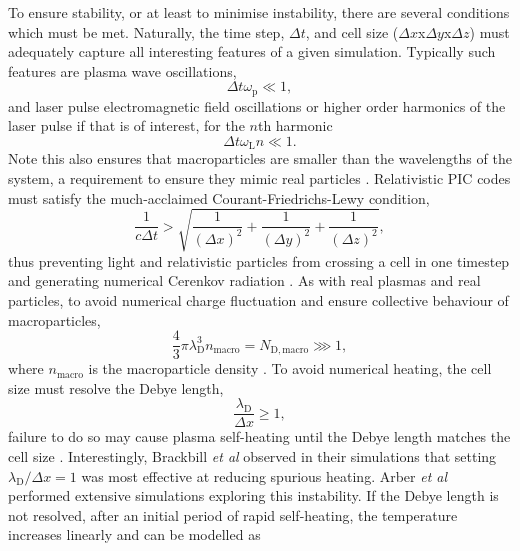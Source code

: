 To ensure stability, or at least to minimise instability, there are several conditions which must be met. Naturally, the time step, $\Delta t$, and cell size ($\Delta x$x$\Delta y$x$\Delta z$) must adequately capture all interesting features of a given simulation. Typically such features are plasma wave oscillations,
\begin{equation}
	\Delta t \omega_\mathrm{p} \ll 1,
\end{equation} 
and laser pulse electromagnetic field oscillations or higher order harmonics of the laser pulse if that is of interest, for the $n$th harmonic
\begin{equation}
	\Delta t\omega_\mathrm{L}n \ll 1.
\end{equation} 
Note this also ensures that macroparticles are smaller than the wavelengths of the system, a requirement to ensure they mimic real particles \cite{okudaCollisionsPlasmaFiniteSize1970}. Relativistic PIC codes must satisfy the much-acclaimed \cite{demouraCourantFriedrichsLewy2013} Courant-Friedrichs-Lewy condition,
\begin{equation}
	\frac{1}{c\Delta t} > \sqrt{\frac{1}{(\Delta x)^2}+\frac{1}{(\Delta y)^2}+\frac{1}{(\Delta z)^2}},
\end{equation}
thus preventing light and relativistic particles from crossing a cell in one timestep and generating numerical Cerenkov radiation \cite{birdsall2004plasma}. As with real plasmas and real particles, to avoid numerical charge fluctuation and ensure collective behaviour of macroparticles,
\begin{equation}
	\frac{4}{3}\pi\lambda_\mathrm{D}^3n_\mathrm{macro} = N_\mathrm{D,macro} \ggg 1,
\end{equation}
where $n_\mathrm{macro}$ is the macroparticle density \cite{birdsall2004plasma}. To avoid numerical heating, the cell size must resolve the Debye length,
\begin{equation}
	\frac{\lambda_\mathrm{D}}{\Delta x} \ge 1,
\end{equation}
failure to do so may cause plasma self-heating until the Debye length matches the cell size \cite{birdsall2004plasma}. Interestingly, Brackbill \textit{et al} \cite{brackbillEnergyMomentumConservation2016} observed in their simulations that setting $\lambda_\mathrm{D}/\Delta x =1$ was most effective at reducing spurious heating. Arber \textit{et al} \cite{arberContemporaryParticleincellApproach2015} performed extensive simulations exploring this instability. If the Debye length is not resolved, after an initial period of rapid self-heating, the temperature increases linearly and can be modelled as
